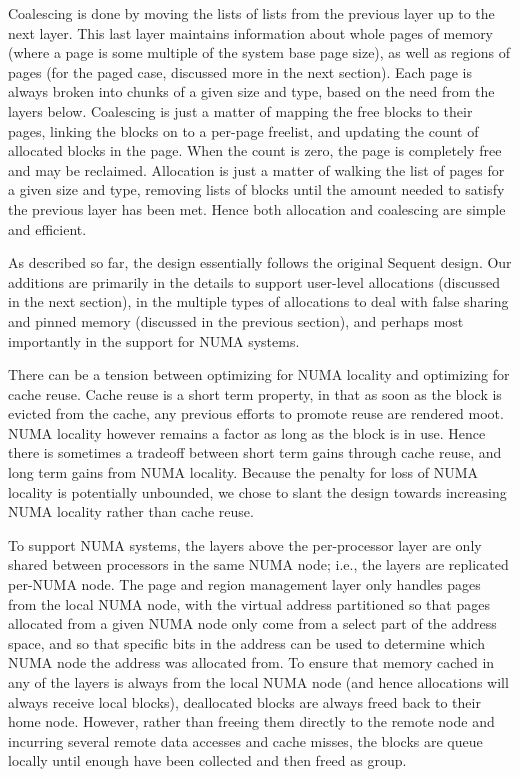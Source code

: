 \documentclass[dvips,11pt]{article}
\begin{document}
Coalescing is done by moving the lists of lists from the previous layer up 
to the next layer.  This last layer maintains information about whole pages 
of memory (where a page is some multiple of the system base page size), as
well as regions of pages (for the paged case, discussed more in the next
section).  Each page is always broken into chunks of a given size and type, 
based on the need from the layers below.  Coalescing is just a matter of
mapping the free blocks to their pages, linking the blocks on to a per-page 
freelist, and updating the count of allocated blocks in the page.  When the 
count is zero, the page is completely free and may be reclaimed.
Allocation is just a matter of walking the list of pages for a given size
and type, removing lists of blocks until the amount needed to satisfy the
previous layer has been met.  Hence both allocation and coalescing are
simple and efficient.

As described so far, the design essentially follows the original Sequent
design.  Our additions are primarily in the details to support user-level
allocations (discussed in the next section), in the multiple types of
allocations to deal with false sharing and pinned memory (discussed in the
previous section), and perhaps most importantly in the support for NUMA
systems.

There can be a tension between optimizing for NUMA locality and optimizing
for cache reuse.  Cache reuse is a short term property, in that as soon as
the block is evicted from the cache, any previous efforts to promote reuse
are rendered moot.  NUMA locality however remains a factor as long as the
block is in use.  Hence there is sometimes a tradeoff between short term
gains through cache reuse, and long term gains from NUMA locality.  Because 
the penalty for loss of NUMA locality is potentially unbounded, we chose to 
slant the design towards increasing NUMA locality rather than cache reuse.

To support NUMA systems, the layers above the per-processor layer are only
shared between processors in the same NUMA node; i.e., the layers are
replicated per-NUMA node.  The page and region management layer only
handles pages from the local NUMA node, with the virtual address
partitioned so that pages allocated from a given NUMA node only come from a
select part of the address space, and so that specific bits in the address
can be used to determine which NUMA node the address was allocated from.
To ensure that memory cached in any of the layers is always from the local
NUMA node (and hence allocations will always receive local blocks),
deallocated blocks are always freed back to their home node.  However,
rather than freeing them directly to the remote node and incurring several
remote data accesses and cache misses, the blocks are queue locally until
enough have been collected and then freed as group.
\end{document}
